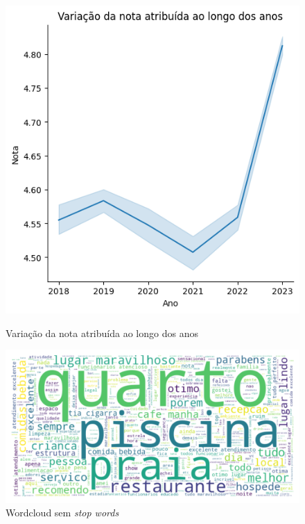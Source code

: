 \begin{figure}
	\centering
	\begin{minipage}{0.45\textwidth}
		\centering
		\includegraphics[width=1\textwidth]{figs/exploratoria/relplot_ano_rating.png}
		\caption{Variação da nota atribuída ao longo dos anos}
		\label{img:relplot_ano_rating}
	\end{minipage}\hfill
	\begin{minipage}{0.45\textwidth}
		\centering
		\includegraphics[width=1\textwidth]{figs/exploratoria/wordcloud_geral.png}
		\caption{Wordcloud sem \textit{stop words}}
		\label{img:wordcloud_geral}
	\end{minipage}
\end{figure}

